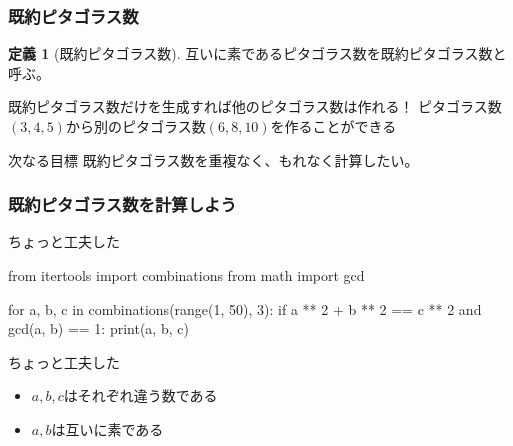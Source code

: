 \documentclass[dvipdfmx,11pt,notheorems]{beamer}
\theoremstyle{definition}
\newtheorem{definition}{定義}
\newtheorem{proposition}{命題}
\begin{document}
\begin{frame}\frametitle{既約ピタゴラス数}

\begin{definition}[既約ピタゴラス数]
互いに素であるピタゴラス数を既約ピタゴラス数と呼ぶ。
\end{definition}

\begin{exampleblock}{既約ピタゴラス数だけを生成すれば他のピタゴラス数は作れる！}
ピタゴラス数$(3, 4, 5)$から別のピタゴラス数$(6, 8, 10)$を作ることができる
\end{exampleblock}

\begin{block}{次なる目標}
既約ピタゴラス数を重複なく、もれなく計算したい。
\end{block}

%
%

\end{frame}

\begin{frame}[fragile]\frametitle{既約ピタゴラス数を計算しよう}

\begin{block}{ちょっと工夫した}
\begin{pyverbatim}
from itertools import combinations
from math import gcd

for a, b, c in combinations(range(1, 50), 3):
    if a ** 2 + b ** 2 == c ** 2 and gcd(a, b) == 1:
        print(a, b, c)
\end{pyverbatim}
\end{block}

\begin{block}{ちょっと工夫した}
\begin{itemize}
\item $a,b,c$はそれぞれ違う数である
\item $a,b$は互いに素である
\end{itemize}
\end{block}

\end{frame}
\end{document}
